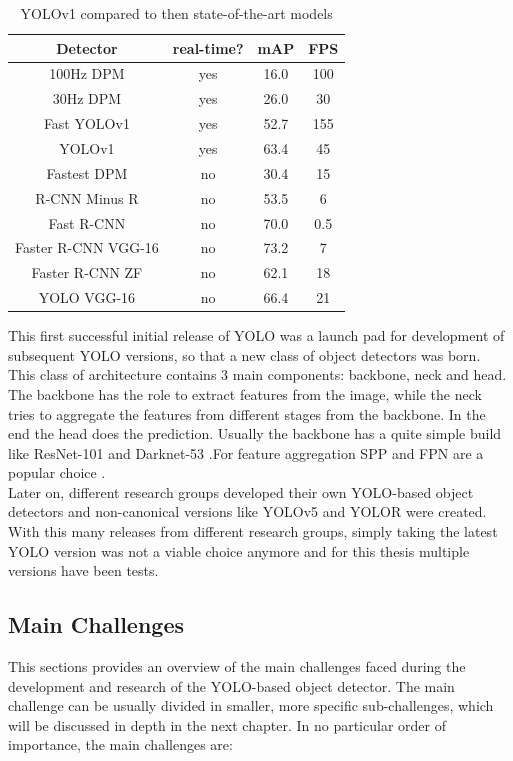 \begin{table}
  \centering
    \begin{tabular}{ ||c|c|c|c||}
    \hline
    Detector & real-time? & mAP & FPS\\ [0.5ex]
    \hline\hline
    100Hz DPM & yes & 16.0 & 100 \\
    30Hz DPM & yes & 26.0 & 30 \\
    Fast YOLOv1 & yes & 52.7 & 155 \\
    YOLOv1 & yes & 63.4 & 45 \\
    Fastest DPM & no & 30.4 & 15 \\
    R-CNN Minus R & no & 53.5 & 6 \\
    Fast R-CNN & no & 70.0 & 0.5 \\
    Faster R-CNN VGG-16 & no & 73.2 & 7 \\
    Faster R-CNN ZF & no & 62.1 & 18 \\
    YOLO VGG-16 & no & 66.4 & 21 \\
    \hline
    \end{tabular}
  \label{intro:yolov1_comp_table}
  \caption{YOLOv1 compared to then state-of-the-art models \cite{yolov1_paper}}
\end{table}

This first successful initial release of YOLO was a launch pad for development of subsequent YOLO versions, so that a new class of object detectors was born. This class of architecture contains 3 main components: backbone, neck and head.
The backbone has the role to extract features from the image, while the neck tries to aggregate the features from different stages from the backbone. In the end the head does the prediction. Usually the backbone has a quite simple build like ResNet-101 and Darknet-53 \cite{yolov3_paper}.For feature aggregation SPP \cite{spp_paper} and FPN \cite{fpn_paper} are a popular choice . \\
Later on, different research groups developed their own YOLO-based object detectors and non-canonical versions like YOLOv5 \cite{yolov5_git} and YOLOR \cite{yolor_paper} were created. With this many releases from different research groups, simply taking the latest YOLO version was not a viable choice anymore and for this thesis multiple versions have been tests.\\

\subsection{Main Challenges} \label{intro:challenges}
This sections provides an overview of the main challenges faced during the development and research of the YOLO-based object detector. The main challenge can be usually divided in smaller, more specific sub-challenges, which will be discussed in depth in the next chapter. In no particular order of importance, the main challenges are:

